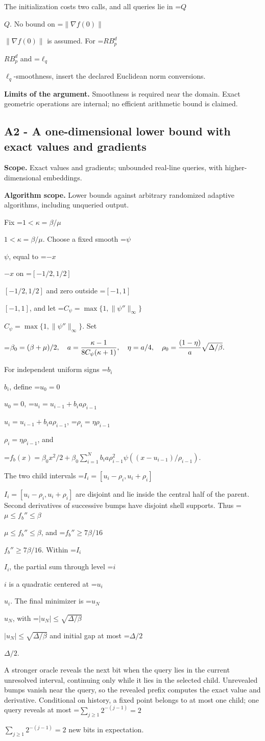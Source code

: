 \documentclass[10pt,a4paper]{article}
\newcommand{\AtlasMath}[1]{\par\begingroup\centering\setbox0=\hbox{$\displaystyle #1$}\ifdim\wd0>1.4\linewidth\typeout{ATLAS WIDE FORMULA: \the\wd0}\fi\ifdim\wd0>\linewidth\resizebox{\linewidth}{!}{\box0}\else\box0\fi\par\endgroup}
\newcommand{\AtlasInlineMath}[1]{\begingroup\setbox0=\hbox{$#1$}\ifdim\wd0>.4\linewidth\endgroup\AtlasMath{#1}\else\endgroup$#1$\fi}
\begin{document}
The initialization costs two calls, and all queries lie in \AtlasInlineMath{Q}. No bound on \AtlasInlineMath{\|\nabla f(0)\|} is assumed. For \AtlasInlineMath{RB_p^d} and \AtlasInlineMath{\ell_q}-smoothness, insert the declared Euclidean norm conversions.

\textbf{Limits of the argument.} Smoothness is required near the domain. Exact geometric operations are internal; no efficient arithmetic bound is claimed.

\subsection{A2 - A one-dimensional lower bound with exact values and gradients}
\textbf{Scope.} Exact values and gradients; unbounded real-line queries, with higher-dimensional embeddings.

\textbf{Algorithm scope.} Lower bounds against arbitrary randomized adaptive algorithms, including unqueried output.

Fix \AtlasInlineMath{1<\kappa=\beta/\mu}. Choose a fixed smooth \AtlasInlineMath{\psi}, equal to \AtlasInlineMath{-x} on \AtlasInlineMath{[-1/2,1/2]} and zero outside \AtlasInlineMath{[-1,1]}, and let \AtlasInlineMath{C_\psi=\max\{1,\|\psi''\|_\infty\}}. Set

\AtlasMath{\beta_0=(\beta+\mu)/2,\quad a={\kappa-1\over8C_\psi(\kappa+1)},\quad
\eta=a/4,\quad \rho_0={(1-\eta)\over a}\sqrt{\Delta/\beta}.}

For independent uniform signs \AtlasInlineMath{b_i}, define \AtlasInlineMath{u_0=0},
\AtlasInlineMath{u_i=u_{i-1}+b_i a\rho_{i-1}}, \AtlasInlineMath{\rho_i=\eta\rho_{i-1}}, and

\AtlasMath{f_b(x)=\beta_0x^2/2+
\beta_0\sum_{i=1}^N b_i a\rho_{i-1}^2
\psi((x-u_{i-1})/\rho_{i-1}).}

The two child intervals \AtlasInlineMath{I_i=[u_i-\rho_i,u_i+\rho_i]} are disjoint and lie inside the central half of the parent. Second derivatives of successive bumps have disjoint shell supports. Thus \AtlasInlineMath{\mu\le f_b''\le\beta}, and \AtlasInlineMath{f_b''\ge7\beta/16}. Within \AtlasInlineMath{I_i}, the partial sum through level \AtlasInlineMath{i} is a quadratic centered at \AtlasInlineMath{u_i}. The final minimizer is \AtlasInlineMath{u_N}, with \AtlasInlineMath{|u_N|\le\sqrt{\Delta/\beta}} and initial gap at most \AtlasInlineMath{\Delta/2}.

A stronger oracle reveals the next bit when the query lies in the current unresolved interval, continuing only while it lies in the selected child. Unrevealed bumps vanish near the query, so the revealed prefix computes the exact value and derivative. Conditional on history, a fixed point belongs to at most one child; one query reveals at most \AtlasInlineMath{\sum_{j\ge1}2^{-(j-1)}=2} new bits in expectation.
\end{document}
